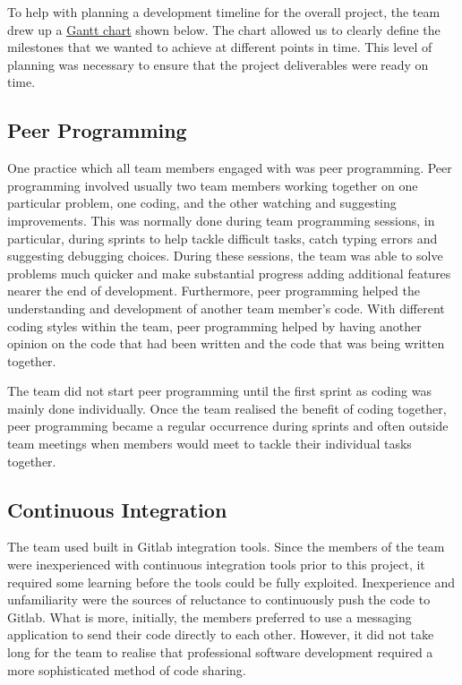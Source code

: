 \documentclass{l3proj}
\begin{document}


To help with planning a development timeline for the overall project, the team drew up a \hyperref[fig:gantt]{Gantt chart} shown below. The chart allowed us to clearly define the milestones that we wanted to achieve at different points in time. This level of planning was necessary to ensure that the project deliverables were ready on time.



\subsection{Peer Programming}
One practice which all team members engaged with was peer programming. Peer programming involved usually two team members working together on one particular problem, one coding, and the other watching and suggesting improvements. This was normally done during team programming sessions, in particular, during sprints to help tackle difficult tasks, catch typing errors and suggesting debugging choices. During these sessions, the team was able to solve problems much quicker and make substantial progress adding additional features nearer the end of development. Furthermore, peer programming helped the understanding and development of another team member's code. With different coding styles within the team, peer programming helped by having another opinion on the code that had been written and the code that was being written together. 

The team did not start peer programming until the first sprint as coding was mainly done individually. Once the team realised the benefit of coding together, peer programming became a regular occurrence during sprints and often outside team meetings when members would meet to tackle their individual tasks together.

\subsection{Continuous Integration}
The team used built in Gitlab integration tools. Since the members of the team were inexperienced with continuous integration tools prior to this project, it required some learning before the tools could be fully exploited. Inexperience and unfamiliarity were the sources of reluctance to continuously push the code to Gitlab. What is more, initially, the members preferred to use a messaging application to send their code directly to each other. However, it did not take long for the team to realise that professional software development required a more sophisticated method of code sharing.
\end{document}
